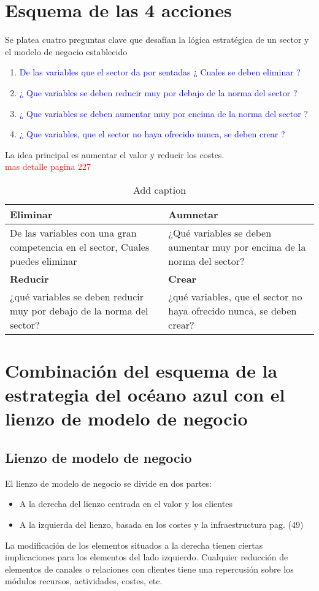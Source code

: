 \documentclass[11pt]{book}
\begin{document}
\section{Esquema de las 4 acciones}
Se platea cuatro preguntas clave que desafían la lógica estratégica de un sector y el modelo de negocio establecido
\begin{enumerate}
\item\textcolor{blue}{De las variables que el sector da por sentadas ¿   Cuales se deben eliminar ?}
\item\textcolor{blue}{¿ Que variables se deben reducir muy por debajo de la norma del sector ?}
\item\textcolor{blue}{¿ Que variables se deben aumentar muy por encima de la norma del sector ?}
\item\textcolor{blue}{¿ Que variables, que el sector no haya ofrecido nunca, se deben crear ?}
\end{enumerate}
La idea principal es aumentar el valor y reducir los costes.\\
\textcolor{red}{mas detalle pagina 227}
\begin{table}[htbp]
  \centering
  \caption{Add caption}
    \begin{tabular}{p{17.285em}|p{16.715em}}
    \textbf{Eliminar} & \textbf{Aumnetar} \\
    \midrule
    De las variables con una gran competencia en el sector, Cuales puedes eliminar & ¿Qué variables se deben aumentar muy por encima de la norma del sector? \\
    \textbf{Reducir} & \textbf{Crear} \\
    \midrule
    ¿qué variables se deben reducir muy por debajo de la norma del sector? & ¿qué variables, que el sector no haya ofrecido nunca, se deben crear? \\
    \end{tabular}%
  \label{tab:addlabel}%
\end{table}%
\section{Combinación del esquema de la estrategia del océano azul con el lienzo de modelo de negocio}
\subsection{Lienzo de modelo de negocio}
El lienzo de modelo de negocio se divide en dos partes:
\begin{itemize}
\item A la derecha del lienzo centrada en el valor y los clientes
\item A la izquierda del lienzo, basada en los costes y la infraestructura pag. (49)
\end{itemize}
La modificación de los elementos situados a la derecha tienen ciertas implicaciones para los elementos del lado izquierdo. Cualquier reducción de elementos de canales o relaciones con clientes tiene una repercusión sobre los módulos recursos, actividades, costes, etc. 
\end{document}
